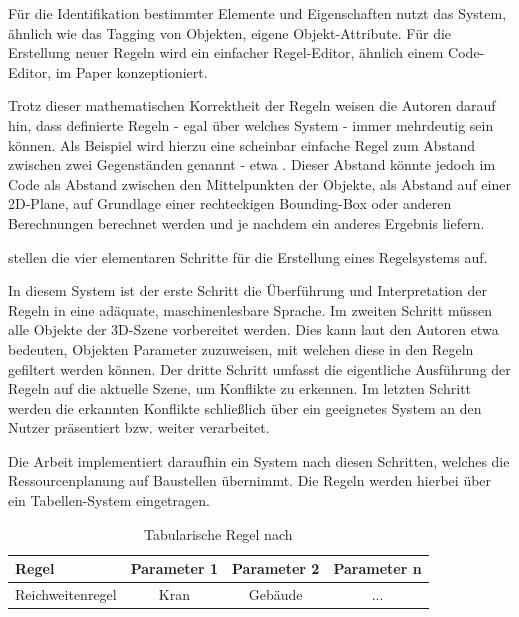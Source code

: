 Für die Identifikation bestimmter Elemente und Eigenschaften nutzt das System, ähnlich wie das Tagging von Objekten, eigene Objekt-Attribute. Für die Erstellung neuer Regeln wird ein einfacher Regel-Editor, ähnlich einem Code-Editor, im Paper konzeptioniert. 

Trotz dieser mathematischen Korrektheit der Regeln weisen die Autoren darauf hin, dass definierte Regeln - egal über welches System - immer mehrdeutig sein können. Als Beispiel wird hierzu eine scheinbar einfache Regel zum Abstand zwischen zwei Gegenständen genannt - etwa . Dieser Abstand könnte jedoch im Code als Abstand zwischen den Mittelpunkten der Objekte, als Abstand auf einer 2D-Plane, auf Grundlage einer rechteckigen Bounding-Box oder anderen Berechnungen berechnet werden und je nachdem ein anderes Ergebnis liefern.

\medskip

\textcite{schwabeBIMApplicationsRuleBased2016a} stellen die vier elementaren Schritte für die Erstellung eines Regelsystems auf.

In diesem System ist der erste Schritt die Überführung und Interpretation der Regeln in eine adäquate, maschinenlesbare Sprache. Im zweiten Schritt müssen alle Objekte der 3D-Szene vorbereitet werden. Dies kann laut den Autoren etwa bedeuten, Objekten Parameter zuzuweisen, mit welchen diese in den Regeln gefiltert werden können. Der dritte Schritt umfasst die eigentliche Ausführung der Regeln auf die aktuelle Szene, um Konflikte zu erkennen. Im letzten Schritt werden die erkannten Konflikte schließlich über ein geeignetes System an den Nutzer präsentiert bzw. weiter verarbeitet.

Die Arbeit implementiert daraufhin ein System nach diesen Schritten, welches die Ressourcenplanung auf Baustellen übernimmt. Die Regeln werden hierbei über ein Tabellen-System eingetragen.

\begin{table}[!h]
\begin{center}
    \begin{tabular}{ | l | c | c | c | }
      \hline
      Regel & Parameter 1 & Parameter 2 & Parameter n \\ \hline \hline
      Reichweitenregel & Kran & Gebäude & ... \\ \hline
    \end{tabular}
\caption{Tabularische Regel nach \textcite{schwabeBIMApplicationsRuleBased2016a}}
\label{tab:bim table rule}
\end{center}
\end{table}

